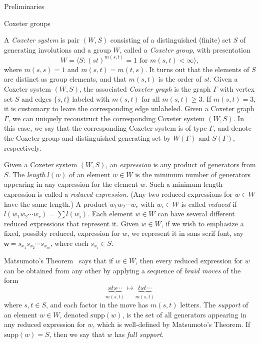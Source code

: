 \documentclass[12pt]{amsart}
\newcommand{\supp}{\mathrm{supp}}
\renewcommand{\(}{\left(}
\renewcommand{\)}{\right)}
\newcommand{\w}{\mathsf{w}}
\begin{document}
\begin{section}{Preliminaries}\label{sec:preliminaries}


\begin{subsection}{Coxeter groups}\label{subsec:Coxeter_groups}

A \emph{Coxeter system} is pair $(W,S)$ consisting of a distinguished (finite) set $S$ of generating involutions and a group $W$, called a \emph{Coxeter group}, with presentation
\[
W = \langle S :(st)^{m(s, t)} = 1 \text{ for } m(s, t) < \infty \rangle,
\] 
where $m(s, s) = 1$ and $m(s, t) = m(t, s)$.  It turns out that the elements of $S$ are distinct as group elements, and that $m(s, t)$ is the order of $st$.  Given a Coxeter system $(W,S)$, the associated \emph{Coxeter graph} is the graph $\Gamma$ with vertex set $S$ and edges $\{s,t\}$ labeled with $m(s,t)$ for all $m(s,t)\geq 3$.  If $m(s,t)=3$, it is customary to leave the corresponding edge unlabeled.  Given a Coxeter graph $\Gamma$, we can uniquely reconstruct the corresponding Coxeter system $(W,S)$.  In this case, we say that the corresponding Coxeter system is of type $\Gamma$, and denote the Coxeter group and distinguished generating set by $W(\Gamma)$ and $S(\Gamma)$, respectively.

Given a Coxeter system $(W,S)$, an \emph{expression} is any product of generators from $S$.  The \emph{length} $l(w)$ of an element $w \in W$ is the minimum number of generators appearing in any expression for the element $w$.  Such a minimum length expression is called a \emph{reduced expression}.  (Any two reduced expressions for $w \in W$ have the same length.)  A product $w_{1}w_{2}\cdots w_{r}$ with $w_{i} \in W$ is called \emph{reduced} if $l(w_{1}w_{2}\cdots w_{r})=\sum l(w_{i})$.  Each element $w \in W$ can have several different reduced expressions that represent it.  Given $w \in W$, if we wish to emphasize a fixed, possibly reduced, expression for $w$, we represent it in \textsf{sans serif} font, say $\w=s_{x_1}s_{x_2}\cdots s_{x_m}$, where each $s_{x_i} \in S$.

Matsumoto's Theorem~\cite[Theorem 1.2.2]{Geck.M;Pfeiffer.G:A} says that if $w \in W$, then every reduced expression for $w$ can be obtained from any other by applying a sequence of \emph{braid moves} of the form 
\[
{\underbrace{sts \cdots }_{m(s,t)} } \mapsto {\underbrace{tst \cdots}_{m(s,t)}}
\]
where $s,t \in S$, and each factor in the move has $m(s,t)$ letters.  The \emph{support} of an element $w \in W$, denoted $\supp(w)$, is the set of all generators appearing in any reduced expression for $w$, which is well-defined by Matsumoto's Theorem.  If $\supp(w)=S$, then we say that $w$ has \emph{full support}.


\end{subsection}
\end{section}
\end{document}
